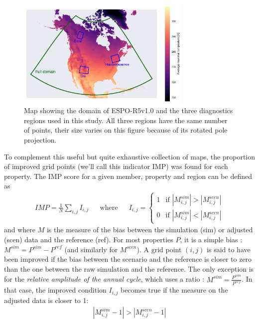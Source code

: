\documentclass[letterpaper,10pt]{article}
\begin{document}
\begin{figure}
    \centering
    \includegraphics[width=0.75\textwidth]{../images/regions_domain_map.pdf}
    \caption{Map showing the domain of ESPO-R5v1.0 and the three diagnostics regions used in this study. All three regions have the same number of points, their size varies on this figure because of its rotated pole projection.}\label{fig:map}
\end{figure}

To complement this useful but quite exhaustive collection of maps, the proportion of improved grid points (we'll call this indicator IMP) was found for each property. The IMP score for a given member, property and region can be defined as
\begin{align}
IMP = \frac{1}{N}\sum_{i,j} I_{i,j} && \text{where} &&
I_{i,j} = \left\{
     \begin{array}{rl}
      1 & \text{if } |M^{sim}_{i,j}| > |M^{scen}_{i,j}|\\
      0 & \text{if } |M^{sim}_{i,j}| < |M^{scen}_{i,j}|
     \end{array}
     \right.
\end{align}
and where $M$ is the measure of the bias between the simulation (sim) or adjusted (scen) data and the reference (ref). For most properties $P$, it is a simple bias : $M^{sim} = P^{sim} - P^{ref}$ (and similarly for $M^{scen}$). A grid point $(i, j)$ is said to have been improved if the bias between the scenario and the reference is closer to zero than the one between the raw simulation and the reference. The only exception is for the \emph{relative amplitude of the annual cycle}, which uses a ratio : $M^{sim} = \frac{P^{sim}}{P^{ref}}$. In that case, the improved condition $I_{i,j}$ becomes true if the measure on the adjusted data is closer to 1:
\begin{align*}
|M^{sim}_{i,j} - 1| > | M^{scen}_{i,j} - 1|
\end{align*}
\end{document}
